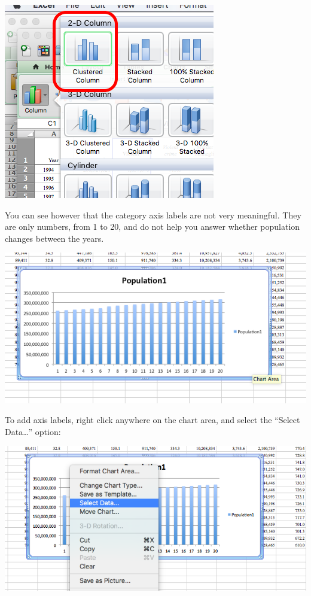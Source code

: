 \documentclass[
]{book}
\begin{document}
\includegraphics{imgs/desc_viz_1.png}

You can see however that the category axis labels are not very meaningful. They are only numbers, from 1 to 20, and do not help you answer whether population changes between the years.

\includegraphics{imgs/pop_blue.png}

To add axis labels, right click anywhere on the chart area, and select the ``Select Data\ldots{}'' option:

\includegraphics{imgs/pb2.png}
\end{document}
